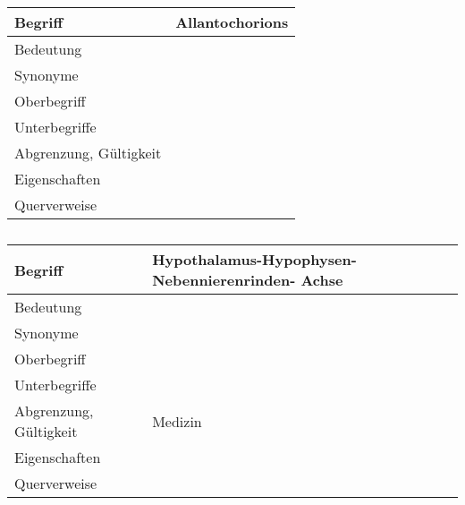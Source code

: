 \begin{table}[h]
	\centering	
	\begin{tabular}{ p{4.5cm} p{10.5cm} } 
		\toprule[1pt]
		\rowcolor{maroon!30}
		\textbf{Begriff} &  \textbf{Allantochorions}\\		
		\midrule
		Bedeutung  & \\		
		Synonyme  & \\				
		Oberbegriff  &  \\		
		Unterbegriffe   & \\		
		Abgrenzung, Gültigkeit  & \\				
		Eigenschaften  & \\				
		Querverweise  & \\
		\bottomrule					
		
	\end{tabular}
	\label{tab:}
	\caption{}
\end{table}

\begin{table}[h]
	\centering	
	\begin{tabular}{ p{4.5cm} p{10.5cm} } 
		\toprule[1pt]
		\rowcolor{maroon!30}
		\textbf{Begriff} &  \textbf{Hypothalamus-Hypophysen-Nebennierenrinden- Achse}\\		
		\midrule
		Bedeutung  & \\		
		Synonyme  & \\			
		Oberbegriff  &  \\		
		Unterbegriffe   & \\		
		Abgrenzung, Gültigkeit  & Medizin\\			
		Eigenschaften  &\\			
		Querverweise  & \\
		\bottomrule					
		
	\end{tabular}
	\label{tab: Glossareintrag zu Hypothalamus-Hypophysen-Nebennierenrinden- Achse}
	\caption{}
\end{table}
